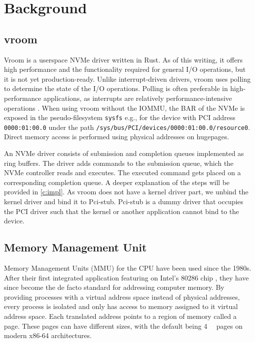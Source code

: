\chapter{Background}

\section{vroom}
Vroom is a userspace NVMe driver written in Rust. As of this writing, it offers high performance and the functionality required for general I/O operations, but it is not yet production-ready. Unlike interrupt-driven drivers, vroom uses polling to determine the state of the I/O operations. Polling is often preferable in high-performance applications, as interrupts are relatively performance-intensive operations \cite{spdksubmitting}.
When using vroom without the IOMMU, the BAR of the NVMe is exposed in the pseudo-filesystem \texttt{sysfs} e.g., for the device with PCI address \texttt{0000:01:00.0} under the path \texttt{/sys/bus/PCI/devices/0000:01:00.0/resource0}. Direct memory access is performed using physical addresses on hugepages.

An NVMe driver consists of submission and completion queues implemented as ring buffers. The driver adds commands to the submission queue, which the NVMe controller reads and executes. The executed command gets placed on a corresponding completion queue. A deeper explanation of the steps will be provided in \autoref{c:impl}.
As vroom does not have a kernel driver part, we unbind the kernel driver and bind it to Pci-stub. Pci-stub is a dummy driver that occupies the PCI driver such that the kernel or another application cannot bind to the device.

\section{Memory Management Unit}
Memory Management Units (MMU) for the CPU have been used since the 1980s. After their first integrated application featuring on Intel's 80286 chip \cite{intel80286}, they have since become the de facto standard for addressing computer memory. By providing processes with a virtual address space instead of physical addresses, every process is isolated and only has access to memory assigned to it virtual address space. Each translated address points to a region of memory called a page. These pages can have different sizes, with the default being \qty{4}{\kibi\byte} pages on modern x86-64 architectures.

